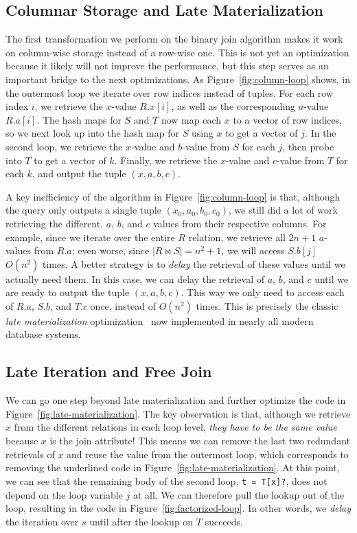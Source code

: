 \subsection{Columnar Storage and Late Materialization}\label{sec:late-materialization}
The first transformation we perform on the binary join algorithm
makes it work on column-wise storage instead of a row-wise one.
This is not yet an optimization because it likely will not improve the
performance, but this step serves as an important bridge to the next
optimizations.
As Figure~\ref{fig:column-loop} shows, in the outermost loop we
iterate over row indices instead of tuples.
For each row index $i$, we retrieve the $x$-value $R.x[i]$,
as well as the corresponding $a$-value $R.a[i]$.
The hash maps for $S$ and $T$ now map each $x$ to a vector of row indices,
so we next look up into the hash map for $S$ using $x$
to get a vector of $j$.
In the second loop, we retrieve the $x$-value and $b$-value
from $S$ for each $j$,
then probe into $T$ to get a vector of $k$.
Finally, we retrieve the $x$-value and $c$-value from $T$ for each $k$,
and output the tuple $(x, a, b, c)$.

A key inefficiency of the algorithm in Figure~\ref{fig:column-loop} is that,
although the query only outputs a single tuple $(x_0, a_0, b_0, c_0)$,
we still did a lot of work retrieving the different, $a$, $b$, and $c$ values
from their respective columns.
For example, since we iterate over the entire $R$ relation,
we retrieve all $2n+1$ $a$-values from $R.a$;
even worse, since $|R \bowtie S| = n^2 + 1$,
we will access $S.b[j]$ $O(n^2)$ times.
A better strategy is to {\em delay} the retrieval of these values
until we actually need them.
In this case, we can delay the retrieval of $a$, $b$, and $c$
until we are ready to output the tuple $(x, a, b, c)$.
This way we only need to access each of $R.a$, $S.b$, and $T.c$ once,
instead of $O(n^2)$ times.
This is precisely the classic {\em late materialization}
optimization~\cite{DBLP:conf/icde/AbadiMDM07} now implemented in
nearly all modern database systems.

\subsection{Late Iteration and Free Join}\label{sec:late-materialization}
We can go one step beyond late materialization and further optimize
the code in Figure~\ref{fig:late-materialization}.
The key observation is that, although we retrieve $x$ from the
different relations in each loop level,
{\em they have to be the same value} because $x$ is the join attribute!
This means we can remove the last two redundant retrievals of $x$
and reuse the value from the outermost loop,
which corresponds to removing the underlined code
in Figure~\ref{fig:late-materialization}.
At this point, we can see that the remaining body of the second loop,
\lstinline|t = T[x]?|,
does not depend on the loop variable $j$ at all.
We can therefore pull the lookup out of the loop,
resulting in the code in Figure~\ref{fig:factorized-loop}.
In other words, we {\em delay} the iteration over $s$
until after the lookup on $T$ succeeds.

